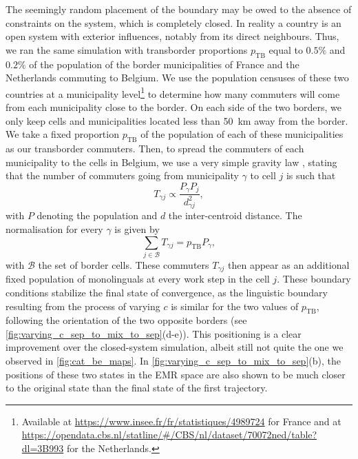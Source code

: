 \documentclass[../thesis.tex]{subfiles}
\begin{document}
The seemingly random placement of the boundary may be owed to the absence of constraints
on the system, which is completely closed. In reality a country is an open system with
exterior influences, notably from its direct neighbours. Thus, we ran the same
simulation with transborder proportions $p_{\text{TB}}$ equal to $0.5\%$ and $0.2\%$ of
the population of the border municipalities of France and the Netherlands commuting to
Belgium. We use the population censuses of these two countries at a municipality
level\footnote{Available at \url{https://www.insee.fr/fr/statistiques/4989724} for
France and at
\url{https://opendata.cbs.nl/statline/\#/CBS/nl/dataset/70072ned/table?dl=3B993} for the
Netherlands.} to determine how many commuters will come from each municipality close to
the border. On each side of the two borders, we only keep cells and municipalities
located less than \SI{50}{\kilo \meter} away from the border. We take a fixed proportion
$p_{\text{TB}}$ of the population of each of these municipalities as our transborder
commuters. Then, to spread the commuters of each municipality to the cells in Belgium,
we use a very simple gravity law \cite{SenGravityModels1995}, stating that the number of
commuters going from municipality $\gamma$ to cell $j$ is such that
\begin{equation}
  T_{\gamma j} \propto \frac{P_\gamma P_j}{d_{\gamma j}^2},
\end{equation}
with $P$ denoting the population and $d$ the inter-centroid distance. The normalisation
for every $\gamma$ is given by
\begin{equation}
  \sum_{j \in \mathcal{B}} T_{\gamma j} = p_{\text{TB}} P_\gamma,
\end{equation}
with $\mathcal{B}$ the set of border cells. These commuters $T_{\gamma j}$ then
appear as an additional fixed population of monolinguals at every work step in the cell
$j$. These boundary conditions stabilize the final state of convergence, as the
linguistic boundary resulting from the process of varying $c$ is similar for the two
values of $p_{\text{TB}}$, following the orientation of the two opposite borders (see
\cref{fig:varying_c_sep_to_mix_to_sep}(d-e)). This positioning is a clear improvement
over the closed-system simulation, albeit still not quite the one we observed in
\cref{fig:cat_be_maps}. In \cref{fig:varying_c_sep_to_mix_to_sep}(b), the positions of
these two states in the \ac{EMR} space are also shown to be much closer to the original
state than the final state of the first trajectory.
\end{document}
